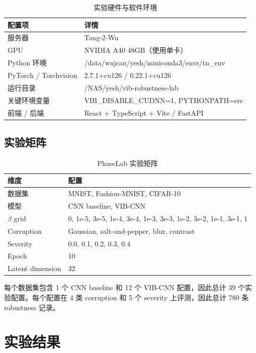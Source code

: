 \documentclass[11pt,a4paper]{article}
\begin{document}
\begin{table}[H]
\centering
\caption{实验硬件与软件环境}
\begin{tabular}{ll}
\toprule
配置项 & 详情 \\
\midrule
服务器 & Tang-2-Wu \\
GPU & NVIDIA A40 48GB（使用单卡） \\
Python 环境 & /data/wujcan/yesh/miniconda3/envs/tn\_env \\
PyTorch / Torchvision & 2.7.1+cu126 / 0.22.1+cu126 \\
运行目录 & /NAS/yesh/vib-robustness-lab \\
关键环境变量 & VIB\_DISABLE\_CUDNN=1, PYTHONPATH=src \\
前端 / 后端 & React + TypeScript + Vite / FastAPI \\
\bottomrule
\end{tabular}
\end{table}

\subsection{实验矩阵}

\begin{table}[H]
\centering
\caption{PhaseLab 实验矩阵}
\begin{tabular}{ll}
\toprule
维度 & 配置 \\
\midrule
数据集 & MNIST, Fashion-MNIST, CIFAR-10 \\
模型 & CNN baseline, VIB-CNN \\
$\beta$ grid & 0, 1e-5, 3e-5, 1e-4, 3e-4, 1e-3, 3e-3, 1e-2, 3e-2, 1e-1, 3e-1, 1 \\
Corruption & Gaussian, salt-and-pepper, blur, contrast \\
Severity & 0.0, 0.1, 0.2, 0.3, 0.4 \\
Epoch & 10 \\
Latent dimension & 32 \\
\bottomrule
\end{tabular}
\end{table}

每个数据集包含 1 个 CNN baseline 和 12 个 VIB-CNN 配置，因此总计 39 个实验配置。每个配置在 4 类 corruption 和 5 个 severity 上评测，因此总计 780 条 robustness 记录。

\section{实验结果}
\end{document}
